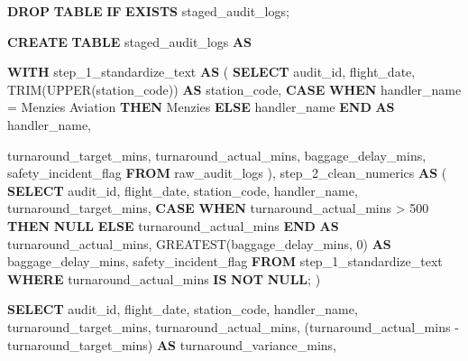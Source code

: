 \documentclass[
  letterpaper,
  DIV=11,
  numbers=noendperiod]{scrartcl}
\newenvironment{Shaded}{\begin{snugshade}}{\end{snugshade}}
\newcommand{\ControlFlowTok}[1]{\textcolor[rgb]{0.00,0.23,0.31}{\textbf{#1}}}
\newcommand{\DecValTok}[1]{\textcolor[rgb]{0.68,0.00,0.00}{#1}}
\newcommand{\FunctionTok}[1]{\textcolor[rgb]{0.28,0.35,0.67}{#1}}
\newcommand{\KeywordTok}[1]{\textcolor[rgb]{0.00,0.23,0.31}{\textbf{#1}}}
\newcommand{\NormalTok}[1]{\textcolor[rgb]{0.00,0.23,0.31}{#1}}
\newcommand{\OperatorTok}[1]{\textcolor[rgb]{0.37,0.37,0.37}{#1}}
\newcommand{\StringTok}[1]{\textcolor[rgb]{0.13,0.47,0.30}{#1}}
\begin{document}
\begin{Shaded}
\begin{Highlighting}[]
\KeywordTok{DROP} \KeywordTok{TABLE} \ControlFlowTok{IF} \KeywordTok{EXISTS}\NormalTok{ staged\_audit\_logs;}

\KeywordTok{CREATE} \KeywordTok{TABLE}\NormalTok{ staged\_audit\_logs }\KeywordTok{AS}

\KeywordTok{WITH}\NormalTok{ step\_1\_standardize\_text }\KeywordTok{AS}\NormalTok{ (}
    \KeywordTok{SELECT} 
\NormalTok{        audit\_id,}
\NormalTok{        flight\_date,}
        \FunctionTok{TRIM}\NormalTok{(}\FunctionTok{UPPER}\NormalTok{(station\_code)) }\KeywordTok{AS}\NormalTok{ station\_code,}
        \ControlFlowTok{CASE} 
            \ControlFlowTok{WHEN}\NormalTok{ handler\_name }\OperatorTok{=} \StringTok{\textquotesingle{}Menzies Aviation\textquotesingle{}} \ControlFlowTok{THEN} \StringTok{\textquotesingle{}Menzies\textquotesingle{}}
            \ControlFlowTok{ELSE}\NormalTok{ handler\_name }
        \ControlFlowTok{END} \KeywordTok{AS}\NormalTok{ handler\_name,}
        
\NormalTok{        turnaround\_target\_mins,}
\NormalTok{        turnaround\_actual\_mins,}
\NormalTok{        baggage\_delay\_mins,}
\NormalTok{        safety\_incident\_flag}
    \KeywordTok{FROM}\NormalTok{ raw\_audit\_logs}
\NormalTok{),}
\NormalTok{step\_2\_clean\_numerics }\KeywordTok{AS}\NormalTok{ (}
    \KeywordTok{SELECT} 
\NormalTok{        audit\_id,}
\NormalTok{        flight\_date,}
\NormalTok{        station\_code,}
\NormalTok{        handler\_name,}
\NormalTok{        turnaround\_target\_mins,}
        \ControlFlowTok{CASE} 
            \ControlFlowTok{WHEN}\NormalTok{ turnaround\_actual\_mins }\OperatorTok{\textgreater{}} \DecValTok{500} \ControlFlowTok{THEN} \KeywordTok{NULL} 
            \ControlFlowTok{ELSE}\NormalTok{ turnaround\_actual\_mins }
        \ControlFlowTok{END} \KeywordTok{AS}\NormalTok{ turnaround\_actual\_mins,}
        \FunctionTok{GREATEST}\NormalTok{(baggage\_delay\_mins, }\DecValTok{0}\NormalTok{) }\KeywordTok{AS}\NormalTok{ baggage\_delay\_mins,}
\NormalTok{        safety\_incident\_flag}
    \KeywordTok{FROM}\NormalTok{ step\_1\_standardize\_text}
    \KeywordTok{WHERE}\NormalTok{ turnaround\_actual\_mins }\KeywordTok{IS} \KeywordTok{NOT} \KeywordTok{NULL}\NormalTok{;}
\NormalTok{)}

\KeywordTok{SELECT} 
\NormalTok{    audit\_id,}
\NormalTok{    flight\_date,}
\NormalTok{    station\_code,}
\NormalTok{    handler\_name,}
\NormalTok{    turnaround\_target\_mins,}
\NormalTok{    turnaround\_actual\_mins,}
\NormalTok{    (turnaround\_actual\_mins }\OperatorTok{{-}}\NormalTok{ turnaround\_target\_mins) }\KeywordTok{AS}\NormalTok{ turnaround\_variance\_mins,}
    


\end{Highlighting}
\end{Shaded}
\end{document}
